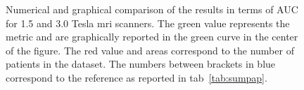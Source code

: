 \begin{figure}
{\begin{tikzpicture}[scale=.48,every node/.style={scale=0.48}]
    \end{tikzpicture}
  }
  \hspace*{\fill}
  \caption{Numerical and graphical comparison of the results in terms of AUC for 1.5 and 3.0 Tesla \ac{mri} scanners. The {\color{semiAuto}green} value represents the metric and are graphically reported in the {\color{semiAuto}green} curve in the center of the figure. The {\color{red}red} value and areas correspond to the number of patients in the dataset. The numbers between brackets in {blue\color{blue}} correspond to the reference as reported in \acs{tab}~\ref{tab:sumpap}.}
  \label{fig:auc}
\end{figure}


